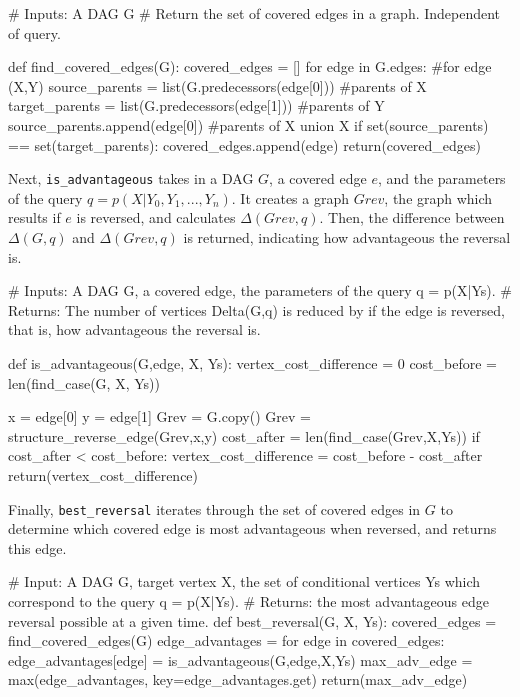 \begin{python}
# Inputs: A DAG G
# Return the set of covered edges in a graph. Independent of query. 

def find_covered_edges(G):
    covered_edges = []
    for edge in G.edges: #for edge (X,Y)
        source_parents = list(G.predecessors(edge[0])) #parents of X
        target_parents = list(G.predecessors(edge[1])) #parents of Y
        source_parents.append(edge[0]) #parents of X union X
        if set(source_parents) == set(target_parents):
            covered_edges.append(edge)
    return(covered_edges)

\end{python}

\null \quad \quad Next, \texttt{is\_advantageous} takes in a DAG $G$, a covered edge $e$, and the parameters of the query $q = p(X|Y_{0},Y_{1},...,Y_{n})$. It creates a graph $Grev$, the graph which results if $e$ is reversed, and calculates $\Delta(Grev,q)$. Then, the difference between $\Delta(G,q)$ and $\Delta(Grev,q)$ is returned, indicating how advantageous the reversal is. 

\begin{python}
# Inputs: A DAG G, a covered edge, the parameters of the query q = p(X|Ys).
# Returns: The number of vertices Delta(G,q) is reduced by if the edge is reversed, that is, how advantageous the reversal is. 

def is_advantageous(G,edge, X, Ys):
    vertex_cost_difference = 0
    cost_before = len(find_case(G, X, Ys))
    
    x = edge[0]
    y = edge[1]
    Grev = G.copy()
    Grev = structure_reverse_edge(Grev,x,y)
    cost_after = len(find_case(Grev,X,Ys))
    if cost_after < cost_before:
        vertex_cost_difference = cost_before - cost_after
    return(vertex_cost_difference)

\end{python}

\null \quad \quad Finally, \texttt{best\_reversal} iterates through the set of covered edges in $G$ to determine which covered edge is most advantageous when reversed, and returns this edge. 

\begin{python}
# Input: A DAG G, target vertex X, the set of conditional vertices Ys which correspond to the query q = p(X|Ys). 
# Returns: the most advantageous edge reversal possible at a given time. 
def best_reversal(G, X, Ys):
    covered_edges = find_covered_edges(G) 
    edge_advantages = {}
    for edge in covered_edges:
         edge_advantages[edge] = is_advantageous(G,edge,X,Ys)
    max_adv_edge = max(edge_advantages, key=edge_advantages.get)
    return(max_adv_edge)

\end{python}
\newpage

